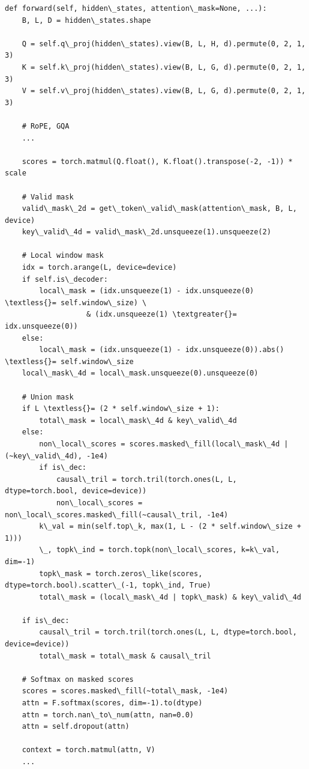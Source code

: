 \begin{lstlisting}
def forward(self, hidden\_states, attention\_mask=None, ...):
    B, L, D = hidden\_states.shape
    
    Q = self.q\_proj(hidden\_states).view(B, L, H, d).permute(0, 2, 1, 3)
    K = self.k\_proj(hidden\_states).view(B, L, G, d).permute(0, 2, 1, 3)
    V = self.v\_proj(hidden\_states).view(B, L, G, d).permute(0, 2, 1, 3)
    
    # RoPE, GQA
    ...
    
    scores = torch.matmul(Q.float(), K.float().transpose(-2, -1)) * scale
    
    # Valid mask
    valid\_mask\_2d = get\_token\_valid\_mask(attention\_mask, B, L, device)
    key\_valid\_4d = valid\_mask\_2d.unsqueeze(1).unsqueeze(2)
    
    # Local window mask
    idx = torch.arange(L, device=device)
    if self.is\_decoder:
        local\_mask = (idx.unsqueeze(1) - idx.unsqueeze(0) \textless{}= self.window\_size) \
                   & (idx.unsqueeze(1) \textgreater{}= idx.unsqueeze(0))
    else:
        local\_mask = (idx.unsqueeze(1) - idx.unsqueeze(0)).abs() \textless{}= self.window\_size
    local\_mask\_4d = local\_mask.unsqueeze(0).unsqueeze(0)
    
    # Union mask
    if L \textless{}= (2 * self.window\_size + 1):
        total\_mask = local\_mask\_4d & key\_valid\_4d
    else:
        non\_local\_scores = scores.masked\_fill(local\_mask\_4d | (~key\_valid\_4d), -1e4)
        if is\_dec:
            causal\_tril = torch.tril(torch.ones(L, L, dtype=torch.bool, device=device))
            non\_local\_scores = non\_local\_scores.masked\_fill(~causal\_tril, -1e4)
        k\_val = min(self.top\_k, max(1, L - (2 * self.window\_size + 1)))
        \_, topk\_ind = torch.topk(non\_local\_scores, k=k\_val, dim=-1)
        topk\_mask = torch.zeros\_like(scores, dtype=torch.bool).scatter\_(-1, topk\_ind, True)
        total\_mask = (local\_mask\_4d | topk\_mask) & key\_valid\_4d
    
    if is\_dec:
        causal\_tril = torch.tril(torch.ones(L, L, dtype=torch.bool, device=device))
        total\_mask = total\_mask & causal\_tril
    
    # Softmax on masked scores
    scores = scores.masked\_fill(~total\_mask, -1e4)
    attn = F.softmax(scores, dim=-1).to(dtype)
    attn = torch.nan\_to\_num(attn, nan=0.0)
    attn = self.dropout(attn)
    
    context = torch.matmul(attn, V)
    ...
\end{lstlisting}

